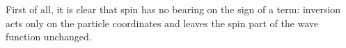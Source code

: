 First of all, it is clear that spin has no bearing on the sign of a term: inversion acts only on the particle coordinates and leaves the spin part of the wave function unchanged.
